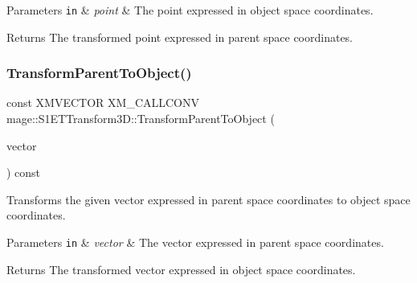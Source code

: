 \begin{DoxyParams}[1]{Parameters}
\mbox{\tt in}  & {\em point} & The point expressed in object space coordinates. \\
\hline
\end{DoxyParams}
\begin{DoxyReturn}{Returns}
The transformed point expressed in parent space coordinates. 
\end{DoxyReturn}
\mbox{\label{classmage_1_1_s1_e_t_transform3_d_aff4a883d1fcab67e5ff5373863f935dc}} 
\subsubsection{\texorpdfstring{Transform\+Parent\+To\+Object()}{TransformParentToObject()}}
{\footnotesize\ttfamily const X\+M\+V\+E\+C\+T\+OR X\+M\+\_\+\+C\+A\+L\+L\+C\+O\+NV mage\+::\+S1\+E\+T\+Transform3\+D\+::\+Transform\+Parent\+To\+Object (\begin{DoxyParamCaption}\item[{F\+X\+M\+V\+E\+C\+T\+OR}]{vector }\end{DoxyParamCaption}) const\hspace{0.3cm}{\ttfamily [noexcept]}}

Transforms the given vector expressed in parent space coordinates to object space coordinates.


\begin{DoxyParams}[1]{Parameters}
\mbox{\tt in}  & {\em vector} & The vector expressed in parent space coordinates. \\
\hline
\end{DoxyParams}
\begin{DoxyReturn}{Returns}
The transformed vector expressed in object space coordinates. 
\end{DoxyReturn}
\mbox{\label{classmage_1_1_s1_e_t_transform3_d_a11f8c6eedc98d3b948fb32c0c9113062}} 
